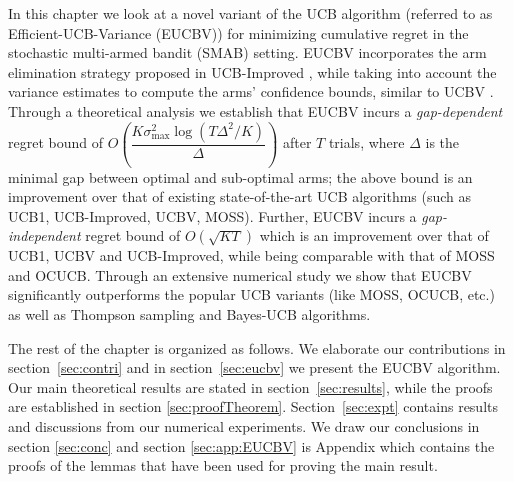 In this chapter we look at a novel variant of the UCB algorithm (referred to as Efficient-UCB-Variance (EUCBV)) for minimizing cumulative regret in the stochastic multi-armed bandit (SMAB) setting. EUCBV incorporates the arm elimination strategy proposed in UCB-Improved \citep{auer2010ucb}, while taking into account the variance estimates to compute the arms' confidence bounds, similar to UCBV \citep{audibert2009exploration}. Through a theoretical analysis we establish that EUCBV incurs a \emph{gap-dependent} regret bound of {\scriptsize $O\left( \dfrac{K\sigma^2_{\max} \log (T\Delta^2 /K)}{\Delta}\right)$} after $T$ trials, where $\Delta$ is the minimal gap between optimal and sub-optimal arms; the above bound is an improvement over that of existing state-of-the-art UCB algorithms (such as UCB1, UCB-Improved, UCBV,  MOSS). Further, EUCBV incurs a \emph{gap-independent} regret bound of {\scriptsize $O\left(\sqrt{KT}\right)$}  which is an improvement over that of UCB1, UCBV and UCB-Improved, while being comparable with that of MOSS and OCUCB. Through an extensive numerical study we show that EUCBV significantly outperforms the popular UCB variants (like MOSS, OCUCB, etc.) as well as Thompson sampling and Bayes-UCB algorithms. 

	The rest of the chapter is organized as follows. We elaborate our contributions in section~\ref{sec:contri} and in section~\ref{sec:eucbv} we present the  EUCBV algorithm. Our main theoretical results are stated in section~\ref{sec:results}, while the proofs are established in   section \ref{sec:proofTheorem}. Section~\ref{sec:expt} contains results and discussions from our numerical experiments. We draw our conclusions in section \ref{sec:conc} and section \ref{sec:app:EUCBV} is Appendix which contains the proofs of the lemmas that have been used for proving the main result.